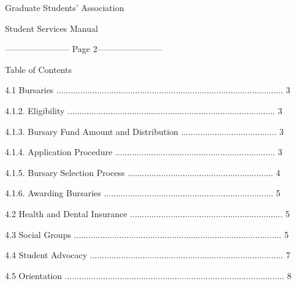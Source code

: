                                    Graduate Students’ Association  



                                        Student Services Manual  



  


----------------------- Page 2-----------------------

                                             Table of Contents  

                                               

  4.1      Bursaries ............................................................................................... 3  



       4.1.2.     Eligibility ....................................................................................... 3  



       4.1.3.     Bursary Fund Amount and Distribution ........................................ 3  



       4.1.4.     Application Procedure ................................................................... 3  



       4.1.5.     Bursary Selection Process ............................................................. 4  



       4.1.6.     Awarding Bursaries ....................................................................... 5  



  4.2      Health and Dental Insurance ................................................................ 5  



  4.3      Social Groups ....................................................................................... 5  



  4.4      Student Advocacy ................................................................................. 7  



  4.5      Orientation ............................................................................................ 8  



